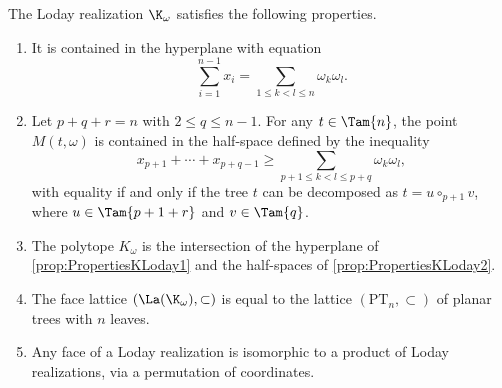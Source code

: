 \begin{proposition}\label{prop:PropertiesKLoday}
The Loday realization $\K_\omega$ satisfies the following properties.
\begin{enumerate}
\item\label{prop:PropertiesKLoday1} It is contained in the hyperplane with equation\vspace*{-3pt}
\[
\sum_{i=1}^{n-1} x_i = \sum_{1\leq k< l\leq n} \omega_k \omega_l.
\]

\item\label{prop:PropertiesKLoday2} Let $p+q+r=n$ with $2\leq q\leq n-1$. For any $t\in \Tam{n}$, the point $M(t, \omega)$ is contained in the half-space defined by the inequality\vspace*{-3pt}
\[
x_{p+1}+\cdots+x_{p+q-1}\geq \sum_{p+1\leq k<l\leq p+q} \omega_k \omega_l,
\]
with equality if and only if the tree $t$ can be decomposed as $t=u\circ_{p+1} v$, where $u\in\Tam{p+1+r}$ and $v\in \Tam{q}$.

\item\label{prop:PropertiesKLoday3} The polytope $K_\omega$ is the intersection of the hyperplane of \eqref{prop:PropertiesKLoday1} and the half-spaces of \eqref{prop:PropertiesKLoday2}.

\item\label{prop:PropertiesKLoday4} The face lattice $(\La(\K_\omega), \subset)$ is equal to the lattice $(\mathrm{PT}_n, \subset)$
of planar trees with $n$ leaves.

\item\label{prop:PropertiesKLoday5} Any face of a Loday realization is isomorphic to a product of Loday realizations, via a permutation of coordinates.
\end{enumerate}
\end{proposition}

